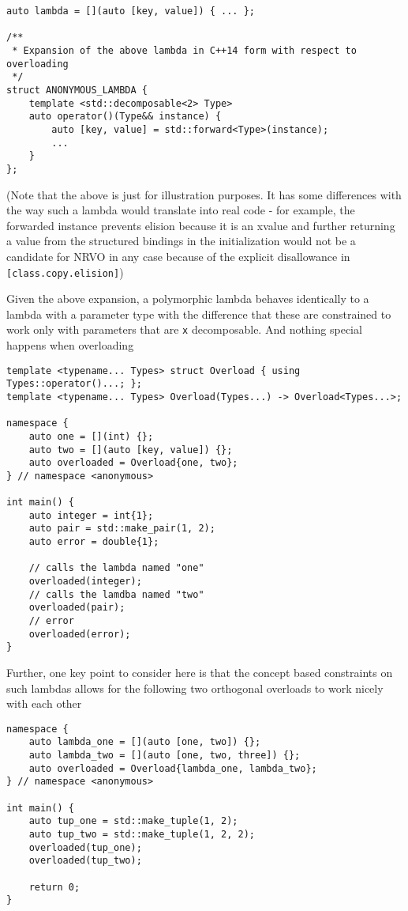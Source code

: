 \documentclass{article}
\begin{document}
\begin{lstlisting}
auto lambda = [](auto [key, value]) { ... };

/**
 * Expansion of the above lambda in C++14 form with respect to overloading
 */
struct ANONYMOUS_LAMBDA {
    template <std::decomposable<2> Type>
    auto operator()(Type&& instance) {
        auto [key, value] = std::forward<Type>(instance);
        ...
    }
};
\end{lstlisting}

(Note that the above is just for illustration purposes.  It has some
differences with the way such a lambda would translate into real code - for
example, the forwarded instance prevents elision because it is an xvalue and
further returning a value from the structured bindings in the initialization
would not be a candidate for NRVO in any case because of the explicit
disallowance in \texttt{[class.copy.elision]})

Given the above expansion, a polymorphic lambda behaves identically to a
lambda with a  parameter type with the difference that these are
constrained to work only with parameters that are \texttt{x} decomposable.
And nothing special happens when overloading

\begin{lstlisting}
template <typename... Types> struct Overload { using Types::operator()...; };
template <typename... Types> Overload(Types...) -> Overload<Types...>;

namespace {
    auto one = [](int) {};
    auto two = [](auto [key, value]) {};
    auto overloaded = Overload{one, two};
} // namespace <anonymous>

int main() {
    auto integer = int{1};
    auto pair = std::make_pair(1, 2);
    auto error = double{1};

    // calls the lambda named "one"
    overloaded(integer);
    // calls the lamdba named "two"
    overloaded(pair);
    // error
    overloaded(error);
}
\end{lstlisting}

Further, one key point to consider here is that the concept based constraints
on such lambdas allows for the following two orthogonal overloads to work
nicely with each other

\begin{lstlisting}
namespace {
    auto lambda_one = [](auto [one, two]) {};
    auto lambda_two = [](auto [one, two, three]) {};
    auto overloaded = Overload{lambda_one, lambda_two};
} // namespace <anonymous>

int main() {
    auto tup_one = std::make_tuple(1, 2);
    auto tup_two = std::make_tuple(1, 2, 2);
    overloaded(tup_one);
    overloaded(tup_two);

    return 0;
}
\end{lstlisting}
\end{document}
